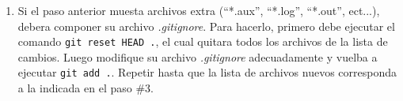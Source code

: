 \documentclass{article}
\begin{document}
\begin{enumerate}
{\begin{itemize}
                    \end{itemize}
            }
            \item{
                    Si el paso anterior muesta archivos extra (``*.aux'', ``*.log'', ``*.out'', ect...),
                    debera componer su archivo \emph{.gitignore}. Para hacerlo, primero
                    debe ejecutar el comando \texttt{git reset HEAD .}, el cual quitara
                    todos los archivos de la lista de cambios. Luego modifique su archivo \emph{.gitignore}
                    adecuadamente y vuelba a ejecutar \texttt{git add .}. Repetir hasta
                    que la lista de archivos nuevos corresponda a la indicada en el paso \#3.
            }
    \end{enumerate}
    
    
    
    
    
    
\end{document}
